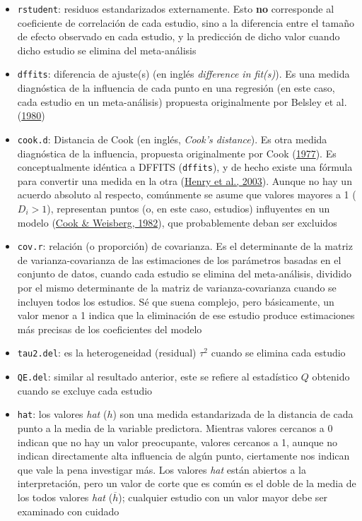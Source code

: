 \documentclass[
  bookmarksnumbered]{article}
\begin{document}
\begin{itemize}
\item
  \texttt{rstudent}: residuos estandarizados externamente. Esto \textbf{no} corresponde al coeficiente de correlación de cada estudio, sino a la diferencia entre el tamaño de efecto observado en cada estudio, y la predicción de dicho valor cuando dicho estudio se elimina del meta-análisis
\item
  \texttt{dffits}: diferencia de ajuste(s) (en inglés \emph{difference in fit(s)}). Es una medida diagnóstica de la influencia de cada punto en una regresión (en este caso, cada estudio en un meta-análisis) propuesta originalmente por Belsley et al. (\protect\hyperlink{ref-belsleyRegressionDiagnosticsIdentifying1980}{1980})
\item
  \texttt{cook.d}: Distancia de Cook (en inglés, \emph{Cook's distance}). Es otra medida diagnóstica de la influencia, propuesta originalmente por Cook (\protect\hyperlink{ref-cookDetectionInfluentialObservation1977}{1977}). Es conceptualmente idéntica a DFFITS (\texttt{dffits}), y de hecho existe una fórmula para convertir una medida en la otra (\protect\hyperlink{ref-Henry2003}{Henry et al., 2003}). Aunque no hay un acuerdo absoluto al respecto, comúnmente se asume que valores mayores a 1 (\(D_{i} > 1\)), representan puntos (o, en este caso, estudios) influyentes en un modelo (\protect\hyperlink{ref-cookResidualsInfluenceRegression1982}{Cook \& Weisberg, 1982}), que probablemente deban ser excluidos
\item
  \texttt{cov.r}: relación (o proporción) de covarianza. Es el determinante de la matriz de varianza-covarianza de las estimaciones de los parámetros basadas en el conjunto de datos, cuando cada estudio se elimina del meta-análisis, dividido por el mismo determinante de la matriz de varianza-covarianza cuando se incluyen todos los estudios. Sé que suena complejo, pero básicamente, un valor menor a 1 indica que la eliminación de ese estudio produce estimaciones más precisas de los coeficientes del modelo
\item
  \texttt{tau2.del}: es la heterogeneidad (residual) \(\tau^2\) cuando se elimina cada estudio
\item
  \texttt{QE.del}: similar al resultado anterior, este se refiere al estadístico \(Q\) obtenido cuando se excluye cada estudio
\item
  \texttt{hat}: los valores \emph{hat} (\(h\)) son una medida estandarizada de la distancia de cada punto a la media de la variable predictora. Mientras valores cercanos a 0 indican que no hay un valor preocupante, valores cercanos a 1, aunque no indican directamente alta influencia de algún punto, ciertamente nos indican que vale la pena investigar más. Los valores \emph{hat} están abiertos a la interpretación, pero un valor de corte que es común es el doble de la media de los todos valores \emph{hat} (\(\overline{h}\)); cualquier estudio con un valor mayor debe ser examinado con cuidado

\end{itemize}
\end{document}
